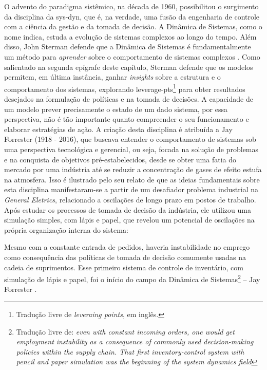 \documentclass[./main.tex]{subfiles}
\begin{document}
\par O advento do paradigma sistêmico, na década de 1960, possibilitou o surgimento da disciplina da \gls{sys-dyn}, que é, na verdade, uma fusão da engenharia de controle com a ciência da gestão e da tomada de decisão. A Dinâmica de Sistemas, como o nome indica, estuda a evolução de sistemas complexos ao longo do tempo. Além disso, John Sterman defende que a Dinâmica de Sistemas é fundamentalmente um método para \textit{aprender} sobre o comportamento de sistemas complexos \cite{sterman2000}. Como salientado na segunda epígrafe deste capítulo, Sterman defende que os modelos permitem, em última instância, ganhar \textit{insights} sobre a estrutura e o comportamento dos sistemas, explorando \gls{leverage-pts}\footnote{Tradução livre de \textit{leveraing points}, em inglês.} para obter resultados desejados na formulação de políticas e na tomada de decisões. A capacidade de um modelo prever precisamente o estado de um dado sistema, por essa perspectiva, não é tão importante quanto compreender o seu funcionamento e elaborar estratégias de ação. A criação desta disciplina é atribuída a Jay Forrester (1918 - 2016), que buscava entender o comportamento de sistemas sob uma perspectiva tecnológica e gerencial, ou seja, focada na solução de problemas e na conquista de objetivos pré-estabelecidos, desde se obter uma fatia do mercado por uma indústria até se reduzir a concentração de gases de efeito estufa na atmosfera. Isso é ilustrado pelo seu relato de que as ideias fundamentais sobre esta disciplina manifestaram-se a partir de um desafiador problema industrial na \textit{General Eletrics}, relacionado a oscilações de longo prazo em postos de trabalho. Após estudar os processos de tomada de decisão da indústria, ele utilizou uma simulação simples, com lápis e papel, que revelou um potencial de oscilações na própria organização interna do sistema:

\begin{adjustwidth}{100pt}{0pt}
\medskip
\small Mesmo com a constante entrada de pedidos, haveria instabilidade no emprego como consequência das políticas de tomada de decisão comumente usadas na cadeia de suprimentos. Esse primeiro sistema de controle de inventário, com simulação de lápis e papel, foi o início do campo da Dinâmica de Sistemas\footnote{Tradução livre de: \textit{even with constant incoming orders, one would get employment instability as a consequence of commonly used decision-making policies within the supply chain. That ﬁrst inventory-control system with pencil and paper simulation was the beginning of the system dynamics ﬁeld}} – Jay Forrester \cite{forrester2007}.
\medskip
\end{adjustwidth}
\end{document}
